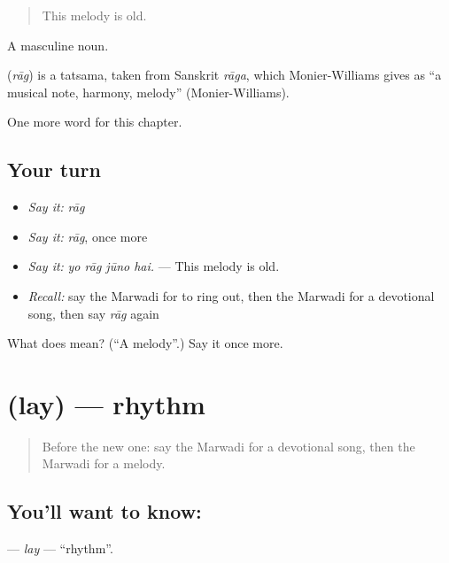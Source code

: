 \begin{quote}
This melody is old.
\end{quote}

A masculine noun.

\begin{cousinweb}
\textbf{} (\emph{rāg}) is a tatsama, taken from Sanskrit \emph{rāga}, which Monier-Williams gives as \textquotedblleft{}a musical note, harmony, melody\textquotedblright{} (Monier-Williams).
\end{cousinweb}

\begin{grammarlens}[title={What you've built}]
One more word for this chapter.
\end{grammarlens}

\subsection*{Your turn}
\begin{itemize}
\raggedright
  \item \emph{Say it:} \emph{rāg}
  \item \emph{Say it:} \emph{rāg}, once more
  \item \emph{Say it:} \emph{yo rāg jūno hai.} — This melody is old.
  \item \emph{Recall:} say the Marwadi for to ring out, then the Marwadi for a devotional song, then say \emph{rāg} again
\end{itemize}

\begin{tcolorbox}[breakable,colback=teal!4,colframe=teal!35!black,title={Before you move on}]
What does  mean? (\textquotedblleft{}A melody\textquotedblright{}.) Say it once more.
\end{tcolorbox}
\section[\texorpdfstring{\mw{लय} (lay)}{लय (lay)}]{ (lay) — rhythm}

\label{lesson:MW-C277-lay}



\begin{quote}
Before the new one: say the Marwadi for a devotional song, then the Marwadi for a melody.
\end{quote}

\subsection*{You'll want to know: }
\textbf{} — \emph{lay} — \textquotedblleft{}rhythm\textquotedblright{}.

